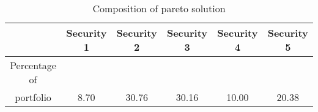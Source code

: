 \begin{table}[ht]
\centering
\begin{tabular}{cccccc}
\toprule
 & Security 1 & Security 2 & Security 3 & Security 4 & Security 5 \\
\midrule
Percentage of \\ portfolio & 8.70 & 30.76 & 30.16 & 10.00 & 20.38 \\
\bottomrule
\end{tabular}
\caption{Composition of pareto solution}
\label{table:ex5_1.4_pf_composition}
\end{table}
